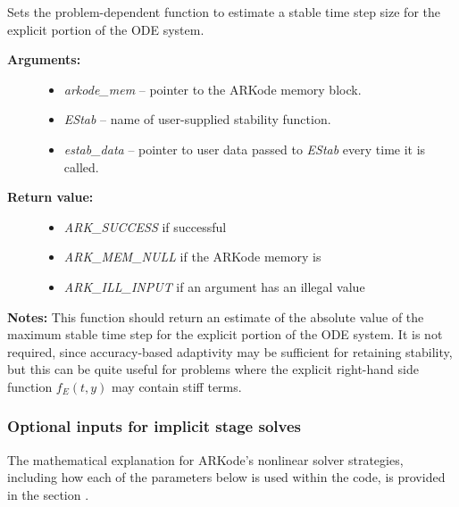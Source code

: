 \documentclass[letterpaper,10pt,english]{sphinxmanual}
\begin{document}
\begin{fulllineitems}
\label{c_interface/User_callable:c.ARKodeSetStabilityFn}
Sets the problem-dependent function to estimate a stable
time step size for the explicit portion of the ODE system.
\begin{description}
\item[{\textbf{Arguments:}}] \leavevmode\begin{itemize}
\item {} 
\emph{arkode\_mem} -- pointer to the ARKode memory block.

\item {} 
\emph{EStab} -- name of user-supplied stability function.

\item {} 
\emph{estab\_data} -- pointer to user data passed to \emph{EStab} every time
it is called.

\end{itemize}

\item[{\textbf{Return value:}}] \leavevmode\begin{itemize}
\item {} 
\emph{ARK\_SUCCESS} if successful

\item {} 
\emph{ARK\_MEM\_NULL} if the ARKode memory is 

\item {} 
\emph{ARK\_ILL\_INPUT} if an argument has an illegal value

\end{itemize}

\end{description}

\textbf{Notes:} This function should return an estimate of the absolute
value of the maximum stable time step for the explicit portion of
the ODE system.  It is not required, since accuracy-based
adaptivity may be sufficient for retaining stability, but this can
be quite useful for problems where the explicit right-hand side
function \(f_E(t,y)\) may contain stiff terms.

\end{fulllineitems}



\subsubsection{Optional inputs for implicit stage solves}
\label{c_interface/User_callable:cinterface-cinterface-arkodesolverinputtable}\label{c_interface/User_callable:optional-inputs-for-implicit-stage-solves}
The mathematical explanation for ARKode's nonlinear solver strategies,
including how each of the parameters below is used within the code, is
provided in the section {\hyperref[Mathematics:mathematics-nonlinear]{\emph{}}}.
\end{document}
